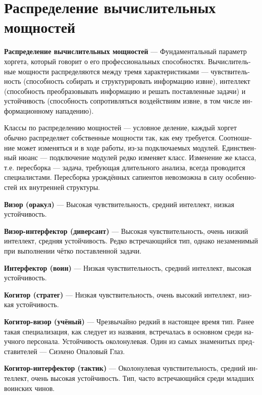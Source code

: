 \documentclass[a4paper,12pt,fleqn]{book}\usepackage{cooltooltips}\usepackage{polyglossia}\setdefaultlanguage[babelshorthands=true]{russian}\setotherlanguage{english}\defaultfontfeatures{Ligatures=TeX,Mapping=tex-text} \usepackage{xcolor}\definecolor{lightgray}{HTML}{bbbbbb}\color{lightgray}\newcommand{\ml}[3]{\textenglish{\textcolor{black}{#3}}}
\newcommand{\asterism}{\vspace{1em}{\centering\Large\bfseries$\ast~\ast~\ast$\par}\vspace{1em}}
\newcommand{\theterm}[3]{\textbf{\hypertarget{#1}{#2}} --- #3}
\begin{document}
\section{Распределение вычислительных мощностей}

\theterm{powers-distribution}
{Распределение вычислительных мощностей}
{Фундаментальный параметр хоргета, который говорит о его профессиональных способностях.
Вычислительные мощности распределяются между тремя характеристиками --- чувствительность (способность собирать и структурировать информацию извне), интеллект (способность преобразовывать информацию и решать поставленные задачи) и устойчивость (способность сопротивляться воздействиям извне, в том числе информационному нападению).

Классы по распределению мощностей --- условное деление, каждый хоргет обычно распределяет собственные мощности так, как ему требуется.
Соотношение может изменяться и в ходе работы, из-за подключаемых модулей.
Единственный нюанс --- подключение модулей редко изменяет класс.
Изменение же класса, т.е. пересборка --- задача, требующая длительного анализа, всегда проводится специалистами.
Пересборка урождённых сапиентов невозможна в силу особенностей их внутренней структуры.}

\asterism

\theterm{visor}
{Визор (оракул)}
{Высокая чувствительность, средний интеллект, низкая устойчивость.}

\theterm{saboteur}
{Визор-интерфектор (диверсант)}
{Высокая чувствительность, очень низкий интеллект, средняя устойчивость.
Редко встречающийся тип, однако незаменимый при выполнении чётко поставленной задачи.}

\theterm{interfector}
{Интерфектор (воин)}
{Низкая чувствительность, средний интеллект, высокая устойчивость.}

\theterm{cogitor}
{Когитор (стратег)}
{Низкая чувствительность, очень высокий интеллект, низкая устойчивость.}

\theterm{scientist}
{Когитор-визор (учёный)}
{Чрезвычайно редкий в настоящее время тип.
Ранее такая специализация, как следует из названия, встречалась в основном среди научного персонала.
Устойчивость околонулевая.
Один из самых знаменитых представителей --- Сиэхено Опаловый Глаз.}

\theterm{tactic}
{Когитор-интерфектор (тактик)}
{Околонулевая чувствительность, средний интеллект, очень высокая устойчивость.
Тип, часто встречающийся среди младших воинских чинов.}
\end{document}
